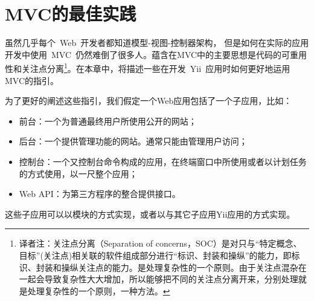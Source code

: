 \chapter{MVC的最佳实践}

虽然几乎每个~Web~开发者都知道模型-视图-控制器架构， 但是如何在实际的应用开发中使用~MVC~仍然难倒了很多人。蕴含在MVC中的主要思想是代码的可重用性和关注点分离\footnote{译者注：关注点分离（Separation of concerns，SOC）是对只与“特定概念、目标”(关注点)相关联的软件组成部分进行“标识、封装和操纵”的能力，即标识、封装和操纵关注点的能力。是处理复杂性的一个原则。由于关注点混杂在一起会导致复杂性大大增加，所以能够把不同的关注点分离开来，分别处理就是处理复杂性的一个原则，一种方法。}。在本章中，将描述一些在开发~Yii~应用时如何更好地运用MVC的指引。


为了更好的阐述这些指引，我们假定一个Web应用包括了一个子应用，比如：

\begin{itemize}
\item 前台：一个为普通最终用户所使用公开的网站；
\item 后台：一个提供管理功能的网站。通常只能由管理用户访问；
\item 控制台：一个又控制台命令构成的应用，在终端窗口中所使用或者以计划任务的方式使用，以一尺整个应用；
\item Web API：为第三方程序的整合提供接口。
\end{itemize}
这些子应用可以以模块的方式实现，或者以与其它子应用Yii应用的方式实现。


